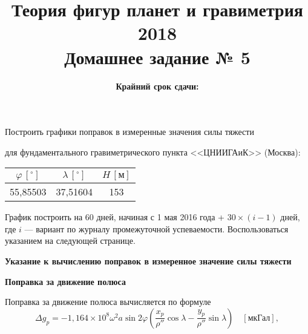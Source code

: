 \documentclass[11pt, a4paper,addpoints]{exam}
\title{{\Large Теория фигур планет и гравиметрия 2018}\\ 
    {\bf\Large Домашнее задание № 5}}
\author{}
\date{\normalsize\bf Крайний срок сдачи: \DTMusedate{deadline}}
\theoremstyle{remark}
\renewcommand{\phi}{\ensuremath{\varphi}}
\begin{document}
\maketitle
\thispagestyle{empty}
\begin{questions}
        \question[5] Построить графики поправок в измеренные значения силы тяжести 
        для фундаментального гравиметрического пункта <<ЦНИИГАиК>> (Москва):
        \begin{table}[h]
            \centering
            \begin{tabular}{|c|c|c|}
                \hline
                 $\phi\, [^\circ]$ & $\lambda\, [^\circ]$ &$H\, [\text{м}]$ \\\hline
                 55,85503 & 37,51604 & 153\\\hline
            \end{tabular}
        \end{table}

        График построить на 60 дней, начиная с 1 мая 2016 года + $30\times (i - 1)$ дней, где $i$ ---
        вариант по журналу промежуточной успеваемости. Воспользоваться указанием на следующей странице.
\end{questions}
\newpage
\thispagestyle{empty}
\begin{center}
    \textbf{Указание к вычислению поправок в измеренное значение силы тяжести}
\end{center}
\begin{flushleft}
    \textbf{Поправка за движение полюса} 
\end{flushleft}
Поправка за движение полюса вычисляется по формуле
    \begin{equation*}
            \Delta g_p = - 1,164\times 10^8 \omega^2 a \sin{2\phi} \left( \dfrac{x_p}{\rho''} \cos\lambda -
            \dfrac{y_p}{\rho''}\sin\lambda \right)\quad[\text{мкГал}],
        \end{equation*}
\end{document}
